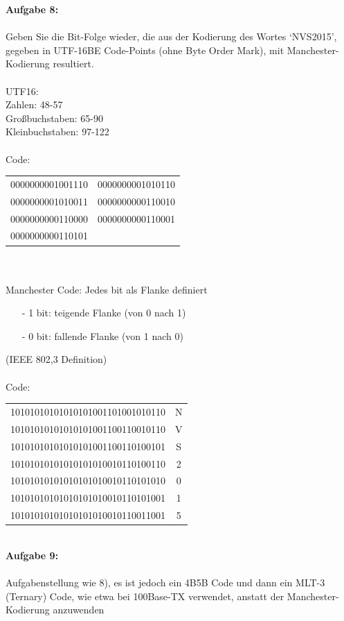 \documentclass[12pt,a4paper]{report}
\theoremstyle{definition}
\begin{document}
\newpage
\textbf{Aufgabe 8:}
\\
\\
Geben Sie die Bit-Folge wieder, die aus der Kodierung des Wortes ‘NVS2015’, gegeben in UTF-16BE Code-Points (ohne Byte Order Mark), mit Manchester-Kodierung resultiert.
\\
\\
UTF16:\\
Zahlen: 48-57\\
Großbuchstaben: 65-90\\
Kleinbuchstaben: 97-122\\
\\
Code:\\
\begin{tabular}{c c}
	0000000001001110 & 0000000001010110\\
	0000000001010011 & 0000000000110010\\
	0000000000110000 & 0000000000110001\\
	0000000000110101
\end{tabular}\\
\\
Manchester Code: Jedes bit als Flanke definiert
\begin{itemize}
	\item[-] 1 bit: teigende Flanke (von 0 nach 1)
	\item[-] 0 bit: fallende Flanke (von 1 nach 0)
\end{itemize}
(IEEE 802,3 Definition)\\
\\
Code:\\
\begin{tabular}{c c}
	10101010101010101001101001010110 & N\\
	10101010101010101001100110010110 & V\\
	10101010101010101001100110100101 & S\\
	10101010101010101010010110100110 & 2\\
	10101010101010101010010110101010 & 0\\
	10101010101010101010010110101001 & 1\\
	10101010101010101010010110011001 & 5\\
\end{tabular}\\
\newpage
\textbf{Aufgabe 9:}
\\
\\
Aufgabenstellung wie 8), es ist jedoch ein 4B5B Code und dann ein MLT-3 (Ternary) Code,
wie etwa bei 100Base-TX verwendet, anstatt der Manchester-Kodierung anzuwenden
\end{document}
